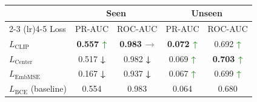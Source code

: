 \documentclass{article}
\begin{document}
\setcounter{table}{4}
\begin{table}[t]
\centering
\small
\setlength{\tabcolsep}{5pt}
\renewcommand{\arraystretch}{1.15}
\begin{threeparttable}
\caption{}
\label{tab:innov_loss}
\begin{tabular}{l c c c c}
\toprule
 & \multicolumn{2}{c}{Seen} & \multicolumn{2}{c}{Unseen} \\
\cmidrule(lr){2-3} \cmidrule(lr){4-5}
Loss & {PR-AUC} & {ROC-AUC} & {PR-AUC} & {ROC-AUC} \\
\midrule
$L_{\text{CLIP}}$ & \bfseries 0.557 \textcolor{ForestGreen}{\textbf{↑}} & \bfseries 0.983 \textcolor{gray}{\textbf{→}} & \bfseries 0.072 \textcolor{ForestGreen}{\textbf{↑}} & 0.692 \textcolor{ForestGreen}{\textbf{↑}} \\
$L_{\text{Center}}$ & 0.517 \textcolor{BrickRed}{\textbf{↓}} & 0.982 \textcolor{BrickRed}{\textbf{↓}} & 0.069 \textcolor{ForestGreen}{\textbf{↑}} & \bfseries 0.703 \textcolor{ForestGreen}{\textbf{↑}} \\
$L_{\text{EmbMSE}}$ & 0.167 \textcolor{BrickRed}{\textbf{↓}} & 0.937 \textcolor{BrickRed}{\textbf{↓}} & 0.067 \textcolor{ForestGreen}{\textbf{↑}} & 0.699 \textcolor{ForestGreen}{\textbf{↑}} \\
\midrule
$L_{\text{BCE}}$ (baseline) & 0.554 & 0.983 & 0.064 & 0.680 \\
\bottomrule
\end{tabular}
\end{threeparttable}
\end{table}
\end{document}
